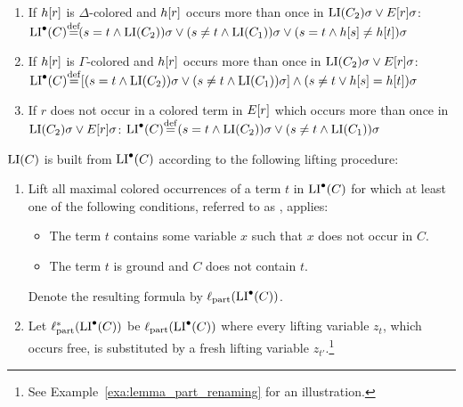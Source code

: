 \begin{defi}
\begin{description}
			\begin{enumerate}

				\item If $h[r]$ is $\Delta$-colored and $h[r]$ occurs more than once in $\operatorname{LI}(C_2)\sigma \lor E[r]\sigma$:
					\newline
					$\LIpre(C) \defeq  ( s=t \land \LI(C_2) )\sigma \lor (s\neq t \land \LI(C_1))\sigma \lor (s=t \land h\occur{s} \neq      h\occur{t})\sigma$

				\item If $h[r]$ is $\Gamma$-colored and $h[r]$ occurs more than once in $\operatorname{LI}(C_2)\sigma \lor E[r]\sigma$:
					\newline
					$\LIpre(C)\defeq{} [ ( s=t \land \LI(C_2) )\sigma \lor (s\neq t \land \LI(C_1))\sigma ] \land\allowbreak (s\neq t \lor h\occur{s} = h\occur{t})\sigma$

				\item If $r$ does not occur in a colored term in $E[r]$ which occurs more than once in $\operatorname{LI}(C_2)\sigma \lor E[r]\sigma$:
					\newline
					$\LIpre(C) \defeq{} ( s=t \land \LI(C_2) )\sigma \lor (s\neq t \land \LI(C_1))\sigma $ 

			\end{enumerate}
	\end{description}

	\noindent
	$\operatorname{LI}(C)$ is built from $\operatorname{LI}^\bullet(C)$ according to the following lifting procedure:

	\begin{enumerate}
		\item Lift all maximal colored occurrences of a term $t$ in $\operatorname{LI}^\bullet(C)$ for which at least one of the following conditions, referred to as , applies:
			\begin{itemize} 
				\item The term $t$ contains some variable $x$ such that $x$ does not occur in $C$.
				\item The term $t$ is ground and $C$ does not contain $t$.
			\end{itemize} 
			Denote the resulting formula by $\ell_\mathrm{part}(\operatorname{LI}^\bullet(C))$.

		\item 
Let $\ell_\mathrm{part}^*(\operatorname{LI}^\bullet(C))$ be 
$\ell_\mathrm{part}(\operatorname{LI}^\bullet(C))$  where every lifting variable $z_t$, which occurs free, is substituted by a fresh lifting variable $z_{t'}$.\footnote{See Example~\ref{exa:lemma_part_renaming} for an illustration.} 
\label{lemma_part_renaming}


\end{enumerate}
\end{defi}
